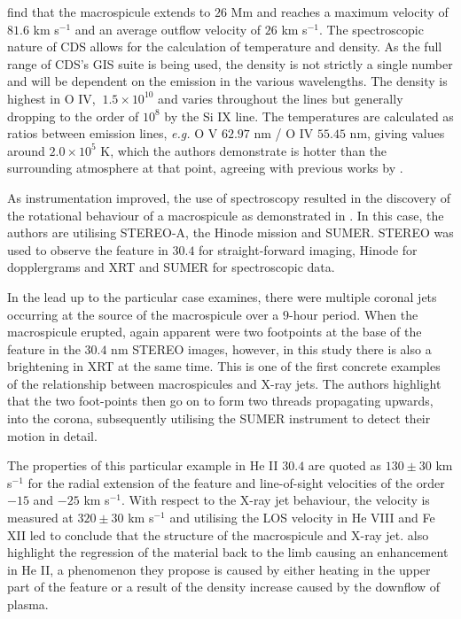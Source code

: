 \cite{Parenti2002} find that the macrospicule extends to $26$ Mm and reaches a maximum velocity of $81.6$ km s${^{-1}}$ and an average outflow velocity of $26$ km s${^{-1}}$.
The spectroscopic nature of CDS allows for the calculation of temperature and density.
As the full range of CDS's GIS suite is being used, the density is not strictly a single number and will be dependent on the emission in the various wavelengths.
The density is highest in O IV, $~1.5 \times 10^{10}$ and varies throughout the lines but generally dropping to the order of $10^8$ by the Si IX line.
The temperatures are calculated as ratios between emission lines, \emph{e.g.} O V $62.97$ nm / O IV $55.45$ nm, giving values around $2.0 \times 10^5$ K, which the authors demonstrate is hotter than the surrounding atmosphere at that point, agreeing with previous works by \cite{Habbal1991}.

As instrumentation improved, the use of spectroscopy resulted in the discovery of the rotational behaviour of a macrospicule as demonstrated in \cite{Kamio2010}.
In this case, the authors are utilising STEREO-A, the Hinode mission and SUMER. 
STEREO was used to observe the feature in $30.4$ for straight-forward imaging, Hinode for dopplergrams and XRT and SUMER for spectroscopic data.

In the lead up to the particular case \cite{Kamio2010} examines, there were multiple coronal jets occurring at the source of the macrospicule over a $9$-hour period.
When the macrospicule erupted, again apparent were two footpoints at the base of the feature in the $30.4$ nm STEREO images, however, in this study there is also a brightening in XRT at the same time. 
This is one of the first concrete examples of the relationship between macrospicules and X-ray jets.
The authors highlight that the two foot-points then go on to form two threads propagating upwards, into the corona, subsequently utilising the SUMER instrument to detect their motion in detail.

The properties of this particular example in He II $30.4$ are quoted as $130 \pm 30$ km s${^{-1}}$ for the radial extension of the feature and line-of-sight velocities of the order $-15$ and $-25$ km s${^{-1}}$.
With respect to the X-ray jet behaviour, the velocity is measured at $320 \pm 30$ km s${^{-1}}$ and utilising the LOS velocity in He VIII and Fe XII led \cite{Kamio2010} to conclude that the structure of the macrospicule and X-ray jet.
\cite{Kamio2010} also highlight the regression of the material back to the limb causing an enhancement in He II, a phenomenon they propose is caused by either heating in the upper part of the feature or a result of the density increase caused by the downflow of plasma.


